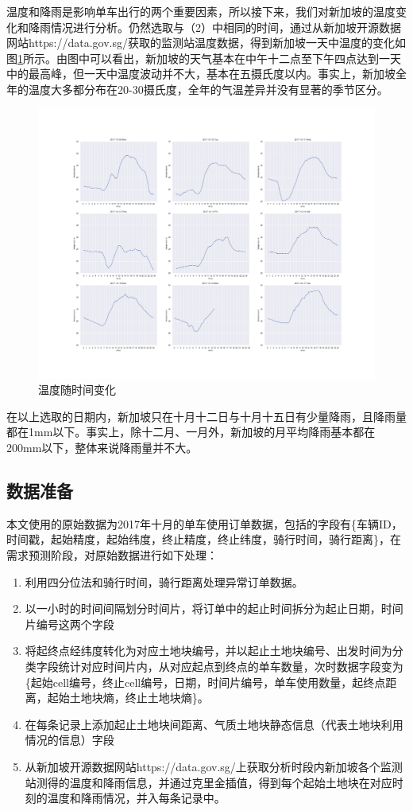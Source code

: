 \documentclass[]{tongjithesis}
\numberwithin{equation}{chapter}
\begin{document}
温度和降雨是影响单车出行的两个重要因素，所以接下来，我们对新加坡的温度变化和降雨情况进行分析。仍然选取与（2）中相同的时间，通过从新加坡开源数据网站https://data.gov.sg/获取的监测站温度数据，得到新加坡一天中温度的变化如图\ref{tempre}所示。由图中可以看出，新加坡的天气基本在中午十二点至下午四点达到一天中的最高峰，但一天中温度波动并不大，基本在五摄氏度以内。事实上，新加坡全年的温度大多都分布在20-30摄氏度，全年的气温差异并没有显著的季节区分。
\begin{figure}[ht!]
	\centering
	\includegraphics[width= 1.0 \textwidth]{figures_main/tempre.png}
	\caption{温度随时间变化}
	\label{tempre}
\end{figure}

在以上选取的日期内，新加坡只在十月十二日与十月十五日有少量降雨，且降雨量都在1mm以下。事实上，除十二月、一月外，新加坡的月平均降雨基本都在200mm以下，整体来说降雨量并不大。


\subsection{数据准备}
本文使用的原始数据为2017年十月的单车使用订单数据，包括的字段有\{车辆ID，时间戳，起始精度，起始纬度，终止精度，终止纬度，骑行时间，骑行距离\}，在需求预测阶段，对原始数据进行如下处理：
\begin{enumerate}
	\item 利用四分位法和骑行时间，骑行距离处理异常订单数据。
	\item 以一小时的时间间隔划分时间片，将订单中的起止时间拆分为起止日期，时间片编号这两个字段
	\item 将起终点经纬度转化为对应土地块编号，并以起止土地块编号、出发时间为分类字段统计对应时间片内，从对应起点到终点的单车数量，次时数据字段变为\{起始cell编号，终止cell编号，日期，时间片编号，单车使用数量，起终点距离，起始土地块熵，终止土地块熵\}。
	\item 在每条记录上添加起止土地块间距离、气质土地块静态信息（代表土地块利用情况的信息）字段
	\item 从新加坡开源数据网站https://data.gov.sg/上获取分析时段内新加坡各个监测站测得的温度和降雨信息，并通过克里金插值，得到每个起始土地块在对应时刻的温度和降雨情况，并入每条记录中。
\end{enumerate}
\end{document}
